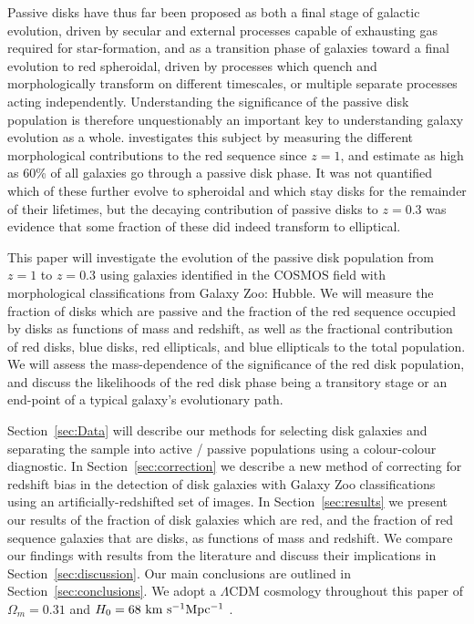 \documentclass[useAMS,usenatbib]{mn2e}
\begin{document}
Passive disks have thus far been proposed as both a final stage of galactic evolution, driven by secular and external processes capable of exhausting gas required for star-formation, and as a transition phase of galaxies toward a final evolution to red spheroidal, driven by processes which quench and morphologically transform on different timescales, or multiple separate processes acting independently. Understanding the significance of the passive disk population is therefore unquestionably an important key to understanding galaxy evolution as a whole. \citet{Bundy2010} investigates this subject by measuring the different morphological contributions to the red sequence since $z=1$, and estimate as high as 60\% of all galaxies go through a passive disk phase. It was not quantified which of these further evolve to spheroidal and which stay disks for the remainder of their lifetimes, but the decaying contribution of passive disks to $z=0.3$ was evidence that some fraction of these did indeed transform to elliptical.

This paper will investigate the evolution of the passive disk population from $z=1$ to $z=0.3$ using galaxies identified in the COSMOS field with morphological classifications from Galaxy Zoo: Hubble. We will measure the fraction of disks which are passive and the fraction of the red sequence occupied by disks as functions of mass and redshift, as well as the fractional contribution of red disks, blue disks, red ellipticals, and blue ellipticals to the total population. We will assess the mass-dependence of the significance of the red disk population, and discuss the likelihoods of the red disk phase being a transitory stage or an end-point of a typical galaxy's evolutionary path.

Section~\ref{sec:Data} will describe our methods for selecting disk galaxies and separating the sample into active / passive populations using a colour-colour diagnostic. In Section~\ref{sec:correction} we describe a new method of correcting for redshift bias in the detection of disk galaxies with Galaxy Zoo classifications using an artificially-redshifted set of images. In Section~\ref{sec:results} we present our results of the fraction of disk galaxies which are red, and the fraction of red sequence galaxies that are disks, as functions of mass and redshift. We compare our findings with results from the literature and discuss their implications in Section~\ref{sec:discussion}. Our main conclusions are outlined in Section~\ref{sec:conclusions}. We adopt a $\Lambda$CDM cosmology throughout this paper of $\Omega_m=0.31$ and $H_0=68~\rm km~s^{-1} Mpc^{-1}$ \citep{PlanckCollaboration2015}.
\end{document}
